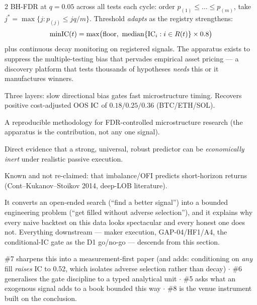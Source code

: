 \documentclass[10pt,a4paper]{article}
\begin{document}
\begin{multicols}{2}
BH-FDR at $q=0.05$ across all tests each cycle: order $p_{(1)}\le\dots\le p_{(m)}$, take
$j^*=\max\{j:p_{(j)}\le jq/m\}$. Threshold \emph{adapts} as the registry strengthens:
\[
  \mathrm{minIC}(t)=\max\bigl(\text{floor},\ \operatorname{median}\{\IC_i: i\in R(t)\}\times0.8\bigr)
\]
plus continuous decay monitoring on registered signals. The apparatus exists to suppress the
multiple-testing bias that pervades empirical asset pricing — a discovery platform that tests
thousands of hypotheses \emph{needs} this or it manufactures winners.

Three layers: slow directional bias gates fast microstructure timing. Recovers positive cost-adjusted
OOS $\operatorname{IC}$ of $0.18/0.25/0.36$ (BTC/ETH/SOL).

\begin{opnums}
\item A reproducible methodology for FDR-controlled microstructure research (the apparatus is the
      contribution, not any one signal).
\item Direct evidence that a strong, universal, robust predictor can be \emph{economically inert}
      under realistic passive execution.
\end{opnums}
Known and not re-claimed: that imbalance/OFI predicts short-horizon returns (Cont--Kukanov--Stoikov
2014, deep-LOB literature).

It converts an open-ended search (``find a better signal'') into a bounded engineering problem
(``get filled without adverse selection''), and it explains why every naive backtest on this data
looks spectacular and every honest one does not. Everything downstream — maker execution, GAP-04/HF1/A4,
the conditional-IC gate as the D1 go/no-go — descends from this section.

\#7 sharpens this into a measurement-first paper (and adds: conditioning on \emph{any} fill \emph{raises}
IC to 0.52, which isolates adverse selection rather than decay) $\cdot$ \#6 generalises the gate
discipline to a typed analytical unit $\cdot$ \#5 asks what an exogenous signal adds to a book bounded
this way $\cdot$ \#8 is the venue instrument built on the conclusion.


\end{multicols}
\end{document}
